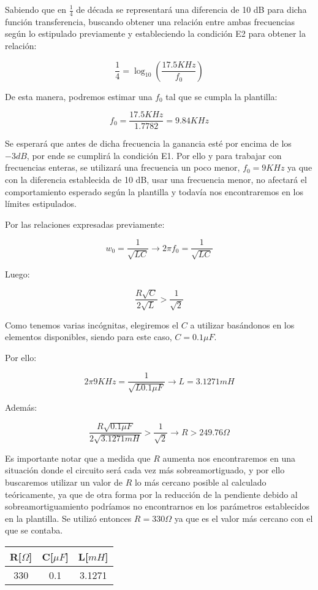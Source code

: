 Sabiendo que en $\frac{1}{4}$ de década se representará una diferencia de 10 dB para dicha función transferencia, buscando obtener una
relación entre ambas frecuencias según lo estipulado previamente y estableciendo la condición E2 para obtener la relación:

$$\frac{1}{4}=\log_{10}(\frac{17.5KHz}{f_0})$$

De esta manera, podremos estimar una $f_0$ tal que se cumpla la plantilla:

$$f_0 = \frac{17.5KHz}{1.7782} = 9.84 KHz$$

Se esperará que antes de dicha frecuencia la ganancia esté por encima de los $-3dB$, por ende se cumplirá la condición E1. 
Por ello y para trabajar con frecuencias enteras, se utilizará una frecuencia un poco menor, $f_0=9 KHz$ ya que con la diferencia establecida de 10 dB, 
usar una frecuencia menor, no afectará el comportamiento esperado según la plantilla y todavía nos encontraremos en los límites estipulados.

Por las relaciones expresadas previamente:

$$w_0=\frac{1}{\sqrt{LC}} \longrightarrow 2\pi f_0=\frac{1}{\sqrt{LC}}$$

Luego:

$$\frac{R\sqrt{C}}{2\sqrt{L}} > \frac{1}{\sqrt{2}}$$

Como tenemos varias incógnitas, elegiremos el $C$ a utilizar basándonos en los elementos disponibles, siendo para este caso,
$C=0.1\mu F$.

Por ello:

$$2\pi 9KHz=\frac{1}{\sqrt{L0.1 \mu F}} \longrightarrow L = 3.1271 mH$$

Además:

$$\frac{R\sqrt{0.1\mu F}}{2\sqrt{3.1271mH}} > \frac{1}{\sqrt{2}} \longrightarrow R > 249.76 \Omega $$

Es importante notar que a medida que $R$ aumenta nos encontraremos en una situación donde el circuito será
cada vez más sobreamortiguado, y por ello buscaremos utilizar un valor de $R$ lo más cercano posible al calculado teóricamente, ya que de otra forma
por la reducción de la pendiente debido al sobreamortiguamiento podríamos no encontrarnos en los parámetros establecidos en la plantilla. 
Se utilizó entonces $R= 330 \Omega$ ya que es el valor más cercano con el que se contaba.


\begin{table}[H]
    \centering
    \begin{tabular}{|c|c|c|}
    \hline
    \rowcolor[HTML]{C0C0C0} 
    R[$\Omega$] & C[$\mu F$] & L[$mH$]  \\ \hline
    330      & 0.1  & 3.1271 \\ \hline
    \end{tabular}
    \end{table}

